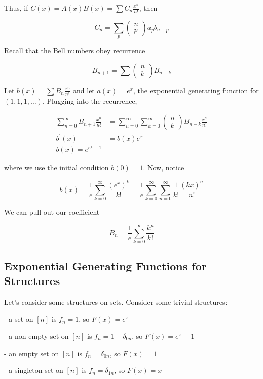 Thus, if $C(x)=A(x) B(x)=\sum C_{n} \frac{x^{n}}{n !}$, then

$$
C_{n}=\sum_{p}\left(\begin{array}{l}
n \\
p
\end{array}\right) a_{p} b_{n-p}
$$

Recall that the Bell numbers obey recurrence

$$
B_{n+1}=\sum\left(\begin{array}{l}
n \\
k
\end{array}\right) B_{n-k}
$$

Let $b(x)=\sum B_{n} \frac{x^{n}}{n !}$ and let $a(x)=e^{x}$, the exponential generating function for $(1,1,1, \ldots)$. Plugging into the recurrence,

$$
\begin{aligned}
\sum_{n=0}^{\infty} B_{n+1} \frac{x^{n}}{n !} & =\sum_{n=0}^{\infty} \sum_{k=0}^{\infty}\left(\begin{array}{l}
n \\
k
\end{array}\right) B_{n-k} \frac{x^{n}}{n !} \\
b^{\prime}(x) & =b(x) e^{x} \\
b(x)=e^{e^{x}-1} &
\end{aligned}
$$

where we use the initial condition $b(0)=1$. Now, notice

$$
b(x)=\frac{1}{e} \sum_{k=0}^{\infty} \frac{\left(e^{x}\right)^{k}}{k !}=\frac{1}{e} \sum_{k=0}^{\infty} \sum_{n=0}^{\infty} \frac{1}{k !} \frac{(k x)^{n}}{n !}
$$

We can pull out our coefficient

$$
B_{n}=\frac{1}{e} \sum_{k=0}^{\infty} \frac{k^{n}}{k !}
$$

\subsection{Exponential Generating Functions for Structures}

Let's consider some structures on sets. Consider some trivial structures:

- a set on $[n]$ is $f_{n}=1$, so $F(x)=e^{x}$

- a non-empty set on $[n]$ is $f_{n}=1-\delta_{0 n}$, so $F(x)=e^{x}-1$

- an empty set on $[n]$ is $f_{n}=\delta_{0 n}$, so $F(x)=1$

- a singleton set on $[n]$ is $f_{n}=\delta_{1 n}$, so $F(x)=x$


